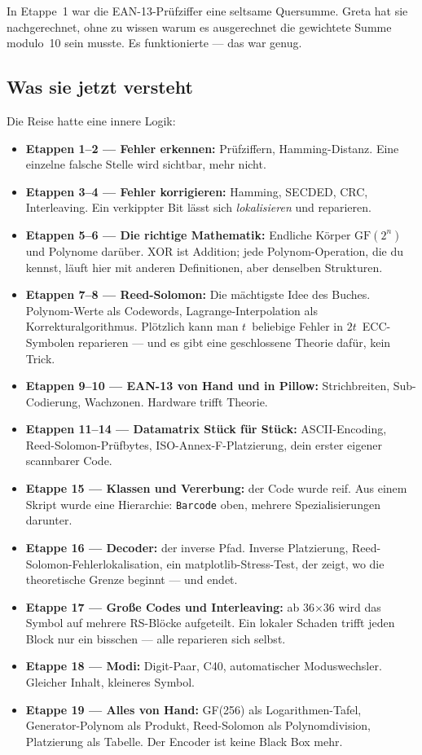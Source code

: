 In Etappe~1 war die EAN-13-Prüfziffer eine seltsame Quersumme. Greta
hat sie nachgerechnet, ohne zu wissen warum es ausgerechnet die
gewichtete Summe modulo~10 sein musste. Es funktionierte — das war
genug.

\subsection*{Was sie jetzt versteht}

Die Reise hatte eine innere Logik:

\begin{itemize}
\item \textbf{Etappen 1--2 — Fehler erkennen:} Prüfziffern, Hamming-Distanz.
  Eine einzelne falsche Stelle wird sichtbar, mehr nicht.
\item \textbf{Etappen 3--4 — Fehler korrigieren:} Hamming, SECDED, CRC,
  Interleaving. Ein verkippter Bit lässt sich \emph{lokalisieren} und
  reparieren.
\item \textbf{Etappen 5--6 — Die richtige Mathematik:} Endliche Körper
  $\mathrm{GF}(2^n)$ und Polynome darüber. XOR ist Addition; jede
  Polynom-Operation, die du kennst, läuft hier mit anderen
  Definitionen, aber denselben Strukturen.
\item \textbf{Etappen 7--8 — Reed-Solomon:} Die mächtigste Idee des Buches.
  Polynom-Werte als Codewords, Lagrange-Interpolation als
  Korrekturalgorithmus. Plötzlich kann man $t$~beliebige Fehler in
  $2t$~ECC-Symbolen reparieren — und es gibt eine geschlossene Theorie
  dafür, kein Trick.
\item \textbf{Etappen 9--10 — EAN-13 von Hand und in Pillow:} Strichbreiten,
  Sub-Codierung, Wachzonen. Hardware trifft Theorie.
\item \textbf{Etappen 11--14 — Datamatrix Stück für Stück:} ASCII-Encoding,
  Reed-Solomon-Prüfbytes, ISO-Annex-F-Platzierung, dein erster eigener
  scannbarer Code.
\item \textbf{Etappe 15 — Klassen und Vererbung:} der Code wurde reif. Aus
  einem Skript wurde eine Hierarchie: \texttt{Barcode} oben, mehrere
  Spezialisierungen darunter.
\item \textbf{Etappe 16 — Decoder:} der inverse Pfad. Inverse Platzierung,
  Reed-Solomon-Fehlerlokalisation, ein matplotlib-Stress-Test, der
  zeigt, wo die theoretische Grenze beginnt — und endet.
\item \textbf{Etappe 17 — Große Codes und Interleaving:} ab 36×36 wird das
  Symbol auf mehrere RS-Blöcke aufgeteilt. Ein lokaler Schaden trifft
  jeden Block nur ein bisschen — alle reparieren sich selbst.
\item \textbf{Etappe 18 — Modi:} Digit-Paar, C40, automatischer
  Moduswechsler. Gleicher Inhalt, kleineres Symbol.
\item \textbf{Etappe 19 — Alles von Hand:} GF(256) als Logarithmen-Tafel,
  Generator-Polynom als Produkt, Reed-Solomon als Polynomdivision,
  Platzierung als Tabelle. Der Encoder ist keine Black Box mehr.
\end{itemize}

